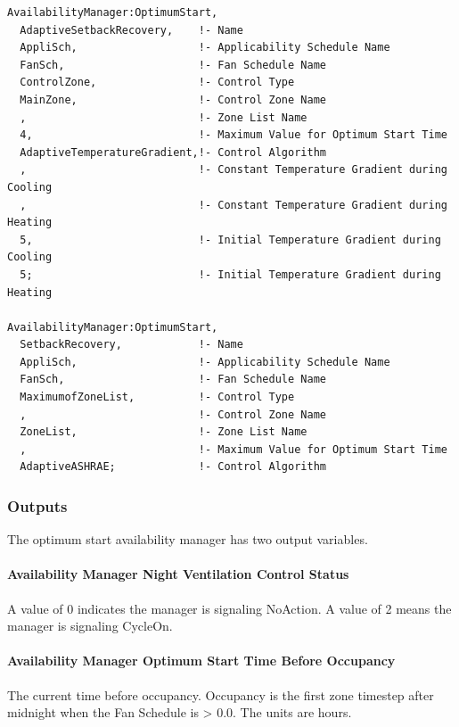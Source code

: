 \begin{lstlisting}
AvailabilityManager:OptimumStart,
  AdaptiveSetbackRecovery,    !- Name
  AppliSch,                   !- Applicability Schedule Name
  FanSch,                     !- Fan Schedule Name
  ControlZone,                !- Control Type
  MainZone,                   !- Control Zone Name
  ,                           !- Zone List Name
  4,                          !- Maximum Value for Optimum Start Time
  AdaptiveTemperatureGradient,!- Control Algorithm
  ,                           !- Constant Temperature Gradient during Cooling
  ,                           !- Constant Temperature Gradient during Heating
  5,                          !- Initial Temperature Gradient during Cooling
  5;                          !- Initial Temperature Gradient during Heating

AvailabilityManager:OptimumStart,
  SetbackRecovery,            !- Name
  AppliSch,                   !- Applicability Schedule Name
  FanSch,                     !- Fan Schedule Name
  MaximumofZoneList,          !- Control Type
  ,                           !- Control Zone Name
  ZoneList,                   !- Zone List Name
  ,                           !- Maximum Value for Optimum Start Time
  AdaptiveASHRAE;             !- Control Algorithm
\end{lstlisting}

\subsubsection{Outputs}\label{outputs-10-007}

The optimum start availability manager has two output variables.

\paragraph{Availability Manager Night Ventilation Control Status}\label{availability-manager-night-ventilation-control-status-1}

A value of 0 indicates the manager is signaling NoAction. A value of 2 means the manager is signaling CycleOn.

\paragraph{Availability Manager Optimum Start Time Before Occupancy}\label{availability-manager-optimum-start-time-before-occupancy}

The current time before occupancy. Occupancy is the first zone timestep after midnight when the Fan Schedule is \textgreater{} 0.0. The units are hours.
